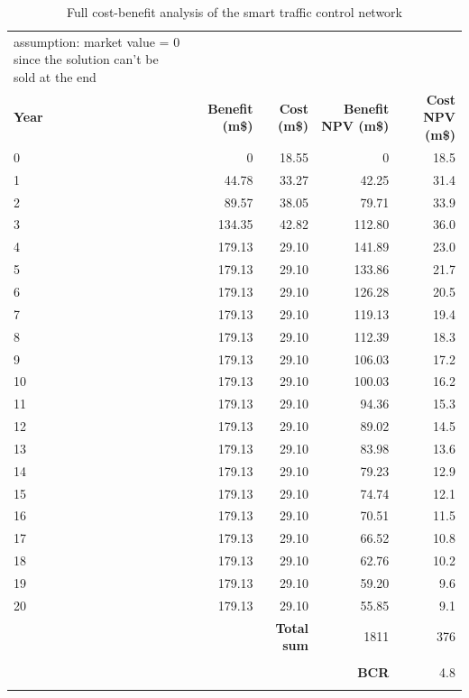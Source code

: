 \documentclass[twoside, a4paper, 11pt]{article}
\begin{document}
\begin{table}[H]
{\begin{tabular}{|l|r|r|r|r|}
assumption: market value = 0 since the solution can't be sold at the end &                    &                &               &             \\
\Xhline{4\arrayrulewidth}
\textbf{Year}& \textbf{Benefit (m\$)} & \textbf{Cost (m\$)}& \textbf{Benefit NPV  (m\$)} & \textbf{Cost NPV (m\$)} \\
0  & 0      & 18.55 & 0      & 18.5 \\
1  & 44.78  & 33.27 & 42.25  & 31.4 \\
2  & 89.57  & 38.05 & 79.71  & 33.9 \\
3  & 134.35 & 42.82 & 112.80 & 36.0 \\
4  & 179.13 & 29.10 & 141.89 & 23.0 \\
5  & 179.13 & 29.10 & 133.86 & 21.7 \\
6  & 179.13 & 29.10 & 126.28 & 20.5 \\
7  & 179.13 & 29.10 & 119.13 & 19.4 \\
8  & 179.13 & 29.10 & 112.39 & 18.3 \\
9  & 179.13 & 29.10 & 106.03 & 17.2 \\
10 & 179.13 & 29.10 & 100.03 & 16.2 \\
11 & 179.13 & 29.10 & 94.36  & 15.3 \\
12 & 179.13 & 29.10 & 89.02  & 14.5 \\
13 & 179.13 & 29.10 & 83.98  & 13.6 \\
14 & 179.13 & 29.10 & 79.23  & 12.9 \\
15 & 179.13 & 29.10 & 74.74  & 12.1 \\
16 & 179.13 & 29.10 & 70.51  & 11.5 \\
17 & 179.13 & 29.10 & 66.52  & 10.8 \\
18 & 179.13 & 29.10 & 62.76  & 10.2 \\
19 & 179.13 & 29.10 & 59.20  & 9.6  \\
20 & 179.13 & 29.10 & 55.85  & 9.1  \\
 &                    & \textbf{Total sum}          & 1811   & 376\\
&                    &                &               &             \\
&                    &                &\cellcolor{green}\textbf{ BCR }          &\cellcolor{green} 4.8\\
\Xhline{2\arrayrulewidth}
\end{tabular}%
}
\caption{Full cost-benefit analysis of the smart traffic control network}
\label{bcastcn}
\end{table}
\end{document}
